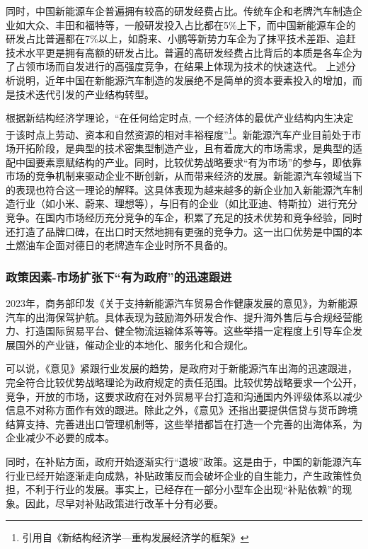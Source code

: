 \documentclass[a4paper, 10pt]{article}
\begin{document}
    同时，中国新能源车企普遍拥有较高的研发经费占比。传统车企和老牌汽车制造企业如大众、丰田和福特等，一般研发投入占比都在5\%上下，而中国新能源车企的研发占比普遍都在7\%以上，如蔚来、小鹏等新势力车企为了抹平技术差距、追赶技术水平更是拥有高额的研发占比。普遍的高研发经费占比背后的本质是各车企为了占领市场而自发进行的高强度竞争，在结果上体现为技术的快速迭代。
上述分析说明，近年中国在新能源汽车制造的发展绝不是简单的资本要素投入的增加，而是技术迭代引发的产业结构转型。

根据新结构经济学理论，“在任何给定时点, 一个经济体的最优产业结构内生决定于该时点上劳动、资本和自然资源的相对丰裕程度”\footnote{引用自《新结构经济学—重构发展经济学的框架》}。新能源汽车产业目前处于市场开拓阶段，是典型的技术密集型制造产业，且有着庞大的市场需求，是典型的适配中国要素禀赋结构的产业。同时，比较优势战略要求“有为市场”的参与，即依靠市场的竞争机制来驱动企业不断创新，从而带来经济的发展。新能源汽车领域当下的表现也符合这一理论的解释。这具体表现为越来越多的新企业加入新能源汽车制造行业（如小米、蔚来、理想等），与旧有的企业（如比亚迪、特斯拉）进行充分竞争。在国内市场经历充分竞争的车企，积累了充足的技术优势和竞争经验，同时还打造了品牌口碑，在出口时天然地拥有更强的竞争力。这一出口优势是中国的本土燃油车企面对德日的老牌造车企业时所不具备的。

\subsubsection{政策因素-市场扩张下“有为政府”的迅速跟进}
    2023年，商务部印发《关于支持新能源汽车贸易合作健康发展的意见》，为新能源汽车的出海保驾护航。具体表现为鼓励海外研发合作、提升海外售后与合规经营能力、打造国际贸易平台、健全物流运输体系等等。这些举措一定程度上引导车企发展国外的产业链，催动企业的本地化、服务化和合规化。

    可以说，《意见》紧跟行业发展的趋势，是政府对于新能源汽车出海的迅速跟进，完全符合比较优势战略理论为政府规定的责任范围。比较优势战略要求一个公开，竞争，开放的市场，这要求政府在对外贸易平台打造和沟通国内外评级体系以减少信息不对称方面作有效的跟进。除此之外，《意见》还指出要提供信贷与货币跨境结算支持、完善进出口管理机制等，这些举措都旨在打造一个完善的出海体系，为企业减少不必要的成本。

    同时，在补贴方面，政府开始逐渐实行“退坡”政策。这是由于，中国的新能源汽车行业已经开始逐渐走向成熟，补贴政策反而会破坏企业的自生能力，产生政策性负担，不利于行业的发展。事实上，已经存在一部分小型车企出现“补贴依赖”的现象。因此，尽早对补贴政策进行改革十分有必要。
\end{document}
